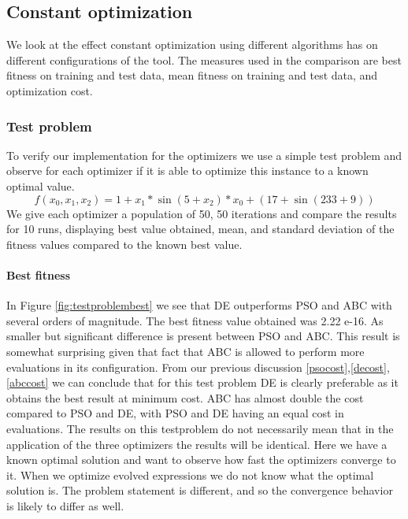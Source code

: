 \subsection{Constant optimization}
We look at the effect constant optimization using different algorithms has on different configurations of the tool. The measures used in the comparison are best fitness on training and test data, mean fitness on training and test data, and optimization cost.

\subsubsection{Test problem}
To verify our implementation for the optimizers we use a simple test problem and observe for each optimizer if it is able to optimize this instance to a known optimal value.
\[
f(x_0, x_1, x_2) = 1 + x_1 * \sin (5+x_2) * x_0 + (17 + \sin (233+9))
\]
We give each optimizer a population of 50, 50 iterations and compare the results for 10 runs, displaying best value obtained, mean, and standard deviation of the fitness values compared to the known best value.
\paragraph{Best fitness}
In Figure \ref{fig:testproblembest} we see that DE outperforms PSO and ABC with several orders of magnitude. The best fitness value obtained was 2.22 e-16. As smaller but significant difference is present between PSO and ABC. This result is somewhat surprising given that fact that ABC is allowed to perform more evaluations in its configuration. From our previous discussion \ref{psocost},\ref{decost},\ref{abccost} we can conclude that for this test problem DE is clearly preferable as it obtains the best result at minimum cost. ABC has almost double the cost compared to PSO and DE, with PSO and DE having an equal cost in evaluations. The results on this testproblem do not necessarily mean that in the application of the three optimizers the results will be identical. Here we have a known optimal solution and want to observe how fast the optimizers converge to it. When we optimize evolved expressions we do not know what the optimal solution is. The problem statement is different, and so the convergence behavior is likely to differ as well. 
